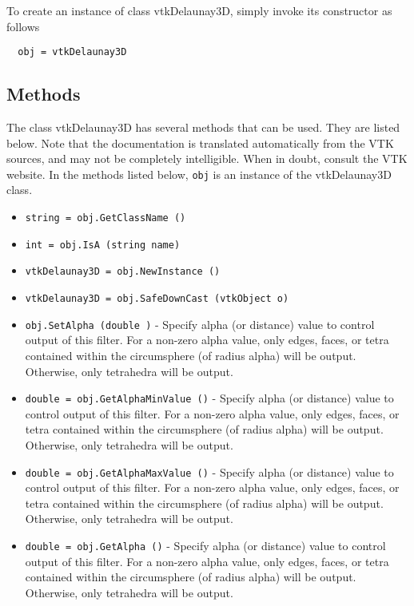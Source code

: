 To create an instance of class vtkDelaunay3D, simply
invoke its constructor as follows
\begin{verbatim}
  obj = vtkDelaunay3D
\end{verbatim}
\subsection{Methods}

The class vtkDelaunay3D has several methods that can be used.
  They are listed below.
Note that the documentation is translated automatically from the VTK sources,
and may not be completely intelligible.  When in doubt, consult the VTK website.
In the methods listed below, \verb|obj| is an instance of the vtkDelaunay3D class.
\begin{itemize}
\item  \verb|string = obj.GetClassName ()|

\item  \verb|int = obj.IsA (string name)|

\item  \verb|vtkDelaunay3D = obj.NewInstance ()|

\item  \verb|vtkDelaunay3D = obj.SafeDownCast (vtkObject o)|

\item  \verb|obj.SetAlpha (double )| -  Specify alpha (or distance) value to control output of this filter.
 For a non-zero alpha value, only edges, faces, or tetra contained 
 within the circumsphere (of radius alpha) will be output. Otherwise,
 only tetrahedra will be output.

\item  \verb|double = obj.GetAlphaMinValue ()| -  Specify alpha (or distance) value to control output of this filter.
 For a non-zero alpha value, only edges, faces, or tetra contained 
 within the circumsphere (of radius alpha) will be output. Otherwise,
 only tetrahedra will be output.

\item  \verb|double = obj.GetAlphaMaxValue ()| -  Specify alpha (or distance) value to control output of this filter.
 For a non-zero alpha value, only edges, faces, or tetra contained 
 within the circumsphere (of radius alpha) will be output. Otherwise,
 only tetrahedra will be output.

\item  \verb|double = obj.GetAlpha ()| -  Specify alpha (or distance) value to control output of this filter.
 For a non-zero alpha value, only edges, faces, or tetra contained 
 within the circumsphere (of radius alpha) will be output. Otherwise,
 only tetrahedra will be output.


\end{itemize}
